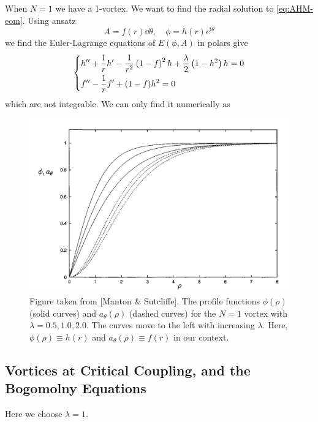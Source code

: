 \documentclass[a4paper,11pt]{article}
\begin{document}
    \begin{ex}
        When $N=1$ we have a 1-vortex. We want to find the radial solution to \eqref{eq:AHM-eom}. Using ansatz
        \begin{equation}
            A = f(r) \dd{\theta}, \quad \phi = h(r) e^{\mathrm{i} \theta}
        \end{equation}
        we find the Euler-Lagrange equations of $E(\phi, A)$ in polars give 
        \begin{equation}
            \begin{dcases}
                h'' + \frac{1}{r} h' - \frac{1}{r^2}\left( 1-f \right)^2 h + \frac{\lambda}{2} \left( 1 - h^2 \right) h = 0\\
                f'' - \frac{1}{r} f' + (1 - f) h^2 = 0
            \end{dcases}
        \end{equation}
        which are not integrable. We can only find it numerically as 

        \begin{figure}[H]
            \centering
            \includegraphics[width=0.5\linewidth]{fig/fig2.png}
            \caption{Figure taken from [Manton \& Sutcliffe]. The profile functions $\phi(\rho)$ (solid curves) and $a_\theta(\rho)$ (dashed curves) for the $N = 1$ vortex with $\lambda = 0.5,1.0,2.0$. The curves move to the left with increasing $\lambda$. Here, $\phi(\rho) \equiv h(r)$ and $a_\theta(\rho) \equiv f(r)$ in our context.}
        \end{figure}
    \end{ex}
    

    \subsection{Vortices at Critical Coupling, and the Bogomolny Equations}

     Here we choose $\lambda = 1$. 
\end{document}
